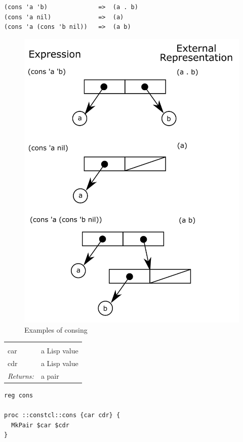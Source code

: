 \documentclass[twoside,9pt]{report}
\begin{document}
\begin{verbatim}
(cons 'a 'b)              =>  (a . b)
(cons 'a nil)             =>  (a)
(cons 'a (cons 'b nil))   =>  (a b)
\end{verbatim}
\begin{figure}[h!]\includegraphics{images/consing.png}\captionsetup{labelformat=empty}\caption{ Examples of consing}\end{figure}
\noindent\begin{tabular}{ |p{1.5cm} p{8cm}| }
\hline
\rowcolor[HTML]{CCCCCC} \multicolumn{2}{|l|}{\bf cons (public)} \\
car & a Lisp value \\
cdr & a Lisp value \\
\textit{Returns:} & a pair \\
\hline
\end{tabular}
\begin{lstlisting}
reg cons
 
proc ::constcl::cons {car cdr} {
  MkPair $car $cdr
}
\end{lstlisting}
\end{document}
